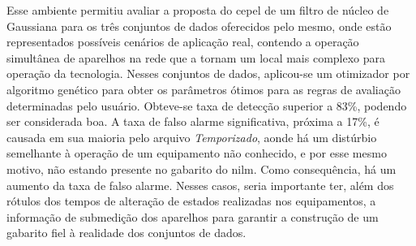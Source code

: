 Esse ambiente permitiu avaliar a proposta do \acs{cepel} de um filtro
de núcleo de Gaussiana para os três conjuntos de dados oferecidos pelo
mesmo, onde estão representados possíveis cenários de aplicação real,
contendo a operação simultânea de aparelhos na rede que a tornam um
local mais complexo para operação da tecnologia. Nesses conjuntos de
dados, aplicou-se um otimizador por algoritmo genético para obter os
parâmetros ótimos para as regras de avaliação determinadas pelo
usuário. Obteve-se taxa de detecção superior a 83\%, podendo ser
considerada boa. A taxa de falso alarme significativa, próxima a 17\%,
é causada em sua maioria pelo arquivo \emph{Temporizado}, aonde há um
distúrbio semelhante à operação de um equipamento não conhecido, e por
esse mesmo motivo, não estando presente no gabarito do \acs{nilm}.
Como consequência, há um aumento da taxa de falso alarme. Nesses
casos, seria importante ter, além dos rótulos dos tempos de alteração
de estados realizadas nos equipamentos, a informação de submedição dos
aparelhos para garantir a construção de um gabarito fiel à realidade
dos conjuntos de dados. 



